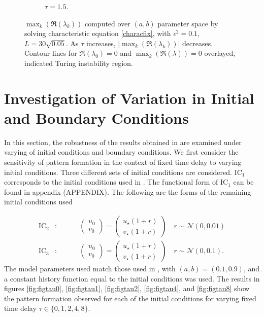 \begin{figure}[H]
\begin{subfigure}[b]{0.45\textwidth}
        \caption{$\tau=1.5$.}
        \label{}
    \end{subfigure}
    \caption{$\max_k(\Re(\lambda_k))$ computed over $(a,b)$ parameter space by solving characteristic equation \eqref{characfix}, with $\epsilon^2=0.1$, $L=30\sqrt{0.05}$. As $\tau$ increases, $|\max_k(\Re(\lambda_k))|$ decreases. Contour lines for $\Re(\lambda_0)=0$ and $\max_k(\Re(\lambda))=0$ overlayed, indicated Turing instability region.}
    \label{fig:fixbif2}
\end{figure}
\section{Investigation of Variation in Initial and Boundary Conditions}
In this section, the robustness of the results obtained in \cite{gaffmonk} are examined under varying of initial conditions and boundary conditions. We first consider the sensitivity of pattern formation in the context of fixed time delay to varying initial conditions. Three different sets of initial conditions are considered. $\text{IC}_1$ corresponds to the initial conditions used in \cite{gaffmonk}. The functional form of $\text{IC}_1$ can be found in appendix (APPENDIX). The following are the forms of the remaining initial conditions used

\begin{align}
\text{IC}_2&:\quad\quad\quad\begin{pmatrix}u_0\\v_0\end{pmatrix}=\begin{pmatrix}u_\star(1+r)\\v_\star(1+r)\end{pmatrix}\quad r\sim\mathcal{N}(0,0.01)\\
\text{IC}_3&:\quad\quad\quad\begin{pmatrix}u_0\\v_0\end{pmatrix}=\begin{pmatrix}u_\star(1+r)\\v_\star(1+r)\end{pmatrix}\quad r\sim\mathcal{N}(0,0.1).
\end{align}
The model parameters used match those used in \cite{gaffmonk}, with $(a,b)=(0.1,0.9)$, and a constant history function equal to the initial conditions was used. The results in figures \ref{fig:figtau0}, \ref{fig:figtau1}, \ref{fig:figtau2}, \ref{fig:figtau4}, and \ref{fig:figtau8} show the pattern formation observed for each of the initial conditions for varying fixed time delay $\tau\in\{0,1,2,4,8 \}$.


